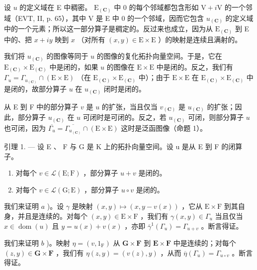 设 \(u\) 的定义域在 E 中稠密。 \(\mathrm{E}_{(\mathbf{C})}\) 中 0 的每个邻域都包含形如 \(\mathrm{V} + i\mathrm{V}\) 的一个邻域（EVT, II, p. 65），其中 V 是 E 中 0 的一个邻域，因而它包含 \(u_{(\mathbf{C})}\) 的定义域中的一个元素；所以这一部分算子是稠定的。反过来也成立，因为从 \(\mathrm{E}_{(\mathbf{C})}\) 到 E 中的、把 \(x + iy\) 映到 \(x\) （对所有 \((x,y) \in \mathrm{E} \times \mathrm{E}\) ）的映射是连续且满射的。

我们将 \(u_{(\mathbf{C})}\) 的图像等同于 \(u\) 的图像的复化拓扑向量空间。于是，它在 \(\mathrm{E}_{(\mathbf{C})} \times \mathrm{E}_{(\mathbf{C})}\) 中是闭的，如果 \(u\) 的图像在 \(\mathrm{E} \times \mathrm{E}\) 中是闭的。反之，我们有 \(\Gamma_u = \Gamma_{u_{(\mathbf{C})}} \cap (\mathrm{E} \times \mathrm{E})\) （在 \(\mathrm{E}_{(\mathbf{C})} \times \mathrm{E}_{(\mathbf{C})}\) 中）；由于 \(\mathrm{E} \times \mathrm{E}\) 在 \(\mathrm{E}_{(\mathbf{C})} \times \mathrm{E}_{(\mathbf{C})}\) 中是闭的，故部分算子 \(u\) 在 \(u_{(\mathbf{C})}\) 闭时是闭的。

从 E 到 F 中的部分算子 \(v\) 是 \(u\) 的扩张，当且仅当 \(v_{(\mathbf{C})}\) 是 \(u_{(\mathbf{C})}\) 的扩张；因此，部分算子 \(u_{(\mathbf{C})}\) 在 \(u\) 可闭时是可闭的。反之，若 \(u_{(\mathbf{C})}\) 可闭，则部分算子 \(u\) 也可闭，因为 \(\overline{\Gamma_u} = \overline{\Gamma_{u_{(\mathbf{C})}}} \cap (\mathrm{E} \times \mathrm{E})\) 这时是泛函图像（命题 1）。

引理 1. — 设 E 、 F 与 G 是 K 上的拓扑向量空间。设 u 是从 E 到 F 的闭算子。

\begin{enumerate}
\def\labelenumi{\alph{enumi})}
\item
  对每个 \(v \in \mathcal{L}(\mathrm{E};\mathrm{F})\) ，部分算子 \(u + v\) 是闭的。
\item
  对每个 \(v \in \mathcal{L}(\mathrm{G};\mathrm{E})\) ，部分算子 \(u \circ v\) 是闭的。
\end{enumerate}

我们来证明 \(a\) )。设 \(\gamma\) 是映射 \((x,y)\mapsto (x,y - v(x))\) ，它从 \(\mathrm{E}\times \mathrm{F}\) 到其自身，并且是连续的。对每个 \((x,y)\in \mathrm{E}\times \mathrm{F}\) ，我们有 \(\gamma (x,y)\in \Gamma_u\) 当且仅当 \(x\in \operatorname {dom}(u)\) 且 \(y = u(x) + v(x)\) ，亦即 \(\overline{\gamma}^{1}(\Gamma_{u}) = \Gamma_{u + v}\) 。断言得证。

我们来证明 \(b\) )。映射 \(\eta = (v, 1_{\mathrm{F}})\) 从 \(\mathbf{G} \times \mathbf{F}\) 到 \(\mathbf{E} \times \mathbf{F}\) 中是连续的；对每个 \((z, y) \in \mathbf{G} \times \mathbf{F}\) ，我们有 \(\eta(z, y) = (v(z), y)\) ，从而 \(\overline{\eta}(\Gamma_u) = \Gamma_{u \circ v}\) 。断言得证。


